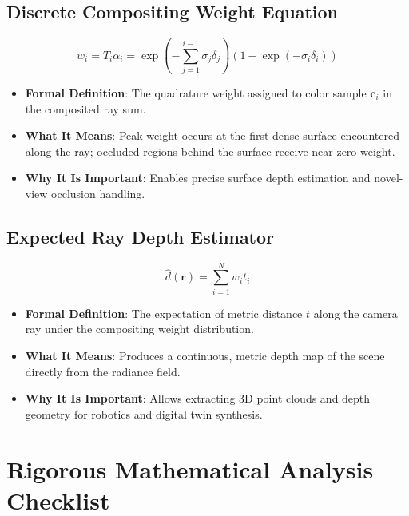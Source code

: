 \documentclass[11pt,a4paper]{article}
\theoremstyle{definition}
\begin{document}
\subsection{Discrete Compositing Weight Equation}
{\boldmath
\begin{equation}
w_i = T_i \alpha_i = \exp\left( -\sum_{j=1}^{i-1} \sigma_j \delta_j \right) \left( 1 - \exp(-\sigma_i \delta_i) \right)
\end{equation}
}
\begin{itemize}
    \item \textbf{Formal Definition}: The quadrature weight assigned to color sample $\mathbf{c}_i$ in the composited ray sum.
    \item \textbf{What It Means}: Peak weight occurs at the first dense surface encountered along the ray; occluded regions behind the surface receive near-zero weight.
    \item \textbf{Why It Is Important}: Enables precise surface depth estimation and novel-view occlusion handling.
\end{itemize}

\subsection{Expected Ray Depth Estimator}
{\boldmath
\begin{equation}
\hat{d}(\mathbf{r}) = \sum_{i=1}^N w_i t_i
\end{equation}
}
\begin{itemize}
    \item \textbf{Formal Definition}: The expectation of metric distance $t$ along the camera ray under the compositing weight distribution.
    \item \textbf{What It Means}: Produces a continuous, metric depth map of the scene directly from the radiance field.
    \item \textbf{Why It Is Important}: Allows extracting 3D point clouds and depth geometry for robotics and digital twin synthesis.
\end{itemize}

\section{Rigorous Mathematical Analysis Checklist}
\end{document}
